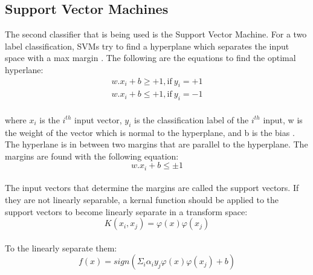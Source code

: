 \documentclass{report}
\begin{document}
\subsection{Support Vector Machines}
The second classifier that is being used is the Support Vector Machine. For a two label classification, SVMs try to find a 
hyperplane which separates the input space with a max margin \cite{classsvm}. 
The following are the equations to find the optimal hyperlane:
\begin{align}
	w.x_i + b \geq + 1, \text{if}\ y_i = +1 \\
	w.x_i + b \leq + 1, \text{if}\ y_i = -1
\end{align}
\\where $x_i$ is the $i^{th}$ input vector, $y_i$ is the classification label of 
the $i^{th}$ input, w is the weight of the vector which is normal to the hyperplane, 
and b is the bias \cite{classsvm}. The hyperlane is in between two margins that 
are parallel to the hyperplane. The margins are found with the following 
equation:
\begin{equation}
	w.x_i + b \leq \pm 1
\end{equation}
\\The input vectors that determine the margins are called the support vectors. 
If they are not linearly separable, a kernal function should be applied to the 
support vectors to become linearly separate in a transform space:
\begin{equation}
	K(x_i, x_j) = \varphi(x)\varphi(x_j)
\end{equation}
\\To the linearly separate them:
\begin{equation}
	f(x) = sign(\Sigma_i \alpha_i y_j \varphi(x)\varphi(x_j) + b)
\end{equation}
\end{document}
